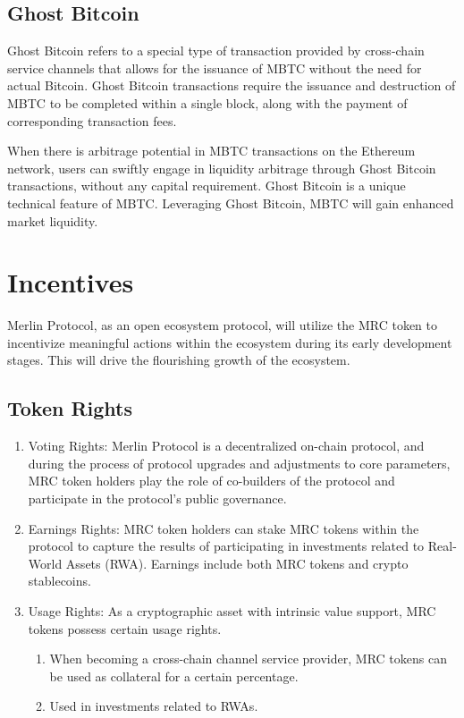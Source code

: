 \documentclass{article}
\begin{document}
\subsection{Ghost Bitcoin}
\par Ghost Bitcoin refers to a special type of transaction provided by cross-chain service channels that allows for the issuance of MBTC without the need for actual Bitcoin. Ghost Bitcoin transactions require the issuance and destruction of MBTC to be completed within a single block, along with the payment of corresponding transaction fees.
\par When there is arbitrage potential in MBTC transactions on the Ethereum network, users can swiftly engage in liquidity arbitrage through Ghost Bitcoin transactions, without any capital requirement. Ghost Bitcoin is a unique technical feature of MBTC. Leveraging Ghost Bitcoin, MBTC will gain enhanced market liquidity.
\section{Incentives}
Merlin Protocol, as an open ecosystem protocol, will utilize the MRC token to incentivize meaningful actions within the ecosystem during its early development stages. This will drive the flourishing growth of the ecosystem.
\subsection{Token Rights}
\begin{enumerate}
    \item Voting Rights: Merlin Protocol is a decentralized on-chain protocol, and during the process of protocol upgrades and adjustments to core parameters, MRC token holders play the role of co-builders of the protocol and participate in the protocol's public governance.
    \item Earnings Rights: MRC token holders can stake MRC tokens within the protocol to capture the results of participating in investments related to Real-World Assets (RWA). Earnings include both MRC tokens and crypto stablecoins.
    \item Usage Rights: As a cryptographic asset with intrinsic value support, MRC tokens possess certain usage rights.
        \begin{enumerate}
            \item When becoming a cross-chain channel service provider, MRC tokens can be used as collateral for a certain percentage.
            \item Used in investments related to RWAs.
        \end{enumerate}
\end{enumerate}
\end{document}
